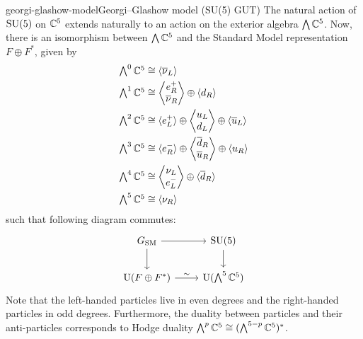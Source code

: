 \begin{topic}{georgi-glashow-model}{Georgi--Glashow model (SU(5) GUT)}
    The natural action of $\textup{SU}(5)$ on $\mathbb{C}^5$ extends naturally to an action on the exterior algebra $\bigwedge \mathbb{C}^5$. Now, there is an isomorphism between $\bigwedge \mathbb{C}^5$ and the Standard Model representation $F \oplus F^*$, given by
    \[ \begin{aligned}
        \textstyle \bigwedge^0 \mathbb{C}^5 &\cong \langle \overline{\nu}_L \rangle \\
        \textstyle \bigwedge^1 \mathbb{C}^5 &\cong \left\langle \begin{matrix} e^+_R \\ \overline{\nu}_R \end{matrix} \right\rangle \oplus \langle d_R \rangle \\
        \textstyle \bigwedge^2 \mathbb{C}^5 &\cong \langle e^+_L \rangle \oplus \left\langle \begin{matrix} u_L \\ d_L \end{matrix} \right\rangle \oplus \langle \overline{u}_L \rangle \\
        \textstyle \bigwedge^3 \mathbb{C}^5 &\cong \langle e^-_R \rangle \oplus \left\langle \begin{matrix} \overline{d}_R \\ \overline{u}_R \end{matrix} \right\rangle \oplus \langle u_R \rangle \\
        \textstyle \bigwedge^4 \mathbb{C}^5 &\cong \left\langle \begin{matrix} \nu_L \\ e^-_L \end{matrix} \right\rangle \oplus \langle \overline{d}_R \rangle \\
        \textstyle \bigwedge^5 \mathbb{C}^5 &\cong \langle \nu_R \rangle
    \end{aligned} \]
    such that following diagram commutes:
    \[ \svg \begin{tikzcd}
        G_\textup{SM} \arrow{r} \arrow{d} & \SU(5) \arrow{d} \\
        \U(F \oplus F^*) \arrow{r}{\sim{}} & \U(\bigwedge^5 \CC^5)
    \end{tikzcd} \]
    Note that the left-handed particles live in even degrees and the right-handed particles in odd degrees. Furthermore, the duality between particles and their anti-particles corresponds to Hodge duality $\bigwedge^p \mathbb{C}^5 \cong (\bigwedge^{5 - p} \mathbb{C}^5)^*$.
\end{topic}

    
